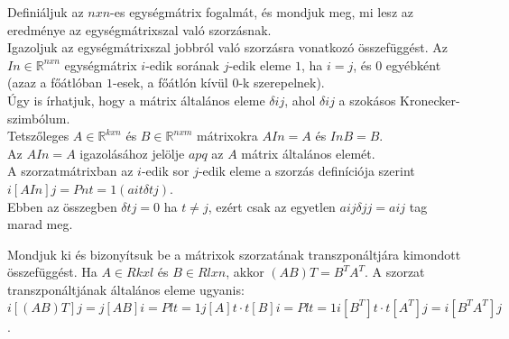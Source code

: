\begin{frame}
  \begin{tcolorbox}[title={7. (4p)}]
      Definiáljuk az $n x n$-es egységmátrix fogalmát, és mondjuk meg, mi lesz az eredménye az egységmátrixszal való szorzásnak.\\
      
      Igazoljuk az egységmátrixszal jobbról való szorzásra vonatkozó összefüggést. 
  \tcblower
    Az $In \in \mathbb{R}^{n x n}$ egységmátrix $i$-edik sorának $j$-edik eleme $1$, ha $i = j$, és $0$ egyébként (azaz a főátlóban $1$-esek, a főátlón kívül $0$-k szerepelnek).\\
    
    Úgy is írhatjuk, hogy a mátrix általános eleme ${\delta}ij$, ahol ${\delta}ij$ a szokásos Kronecker-szimbólum.\\
    
    Tetszőleges $A \in \mathbb{R}^{k x n}$ és $B \in \mathbb{R}^{n x m}$ mátrixokra $AIn = A$ és $InB = B$.\\
    
    Az $AIn = A$ igazolásához jelölje $apq$ az $A$ mátrix általános elemét.\\
    
    A szorzatmátrixban az $i$-edik sor $j$-edik eleme a szorzás definíciója szerint $i[AIn]j = Pn t=1(ait{\delta}tj)$.\\
    
    Ebben az összegben ${\delta}tj = 0$ ha $t \neq j$, ezért csak az egyetlen $aij{\delta}jj = aij$ tag marad meg.
  \end{tcolorbox}
\end{frame}


\begin{frame}
  \begin{tcolorbox}[title={8. (4p)}]
       Mondjuk ki és bizonyítsuk be a mátrixok szorzatának transzponáltjára kimondott összefüggést. 
  \tcblower
    Ha $A \in Rkxl$ és $B \in Rlxn$, akkor $(AB)T = B^TA^T$. A szorzat transzponáltjának általános eleme ugyanis: $i[(AB)T]j = j[AB]i = Pl t=1 j[A]t  \cdot  t[B]i = Pl t=1 i[B^T]t  \cdot  t[A^T]j = i[B^TA^T]j$.
  \end{tcolorbox}
\end{frame}

